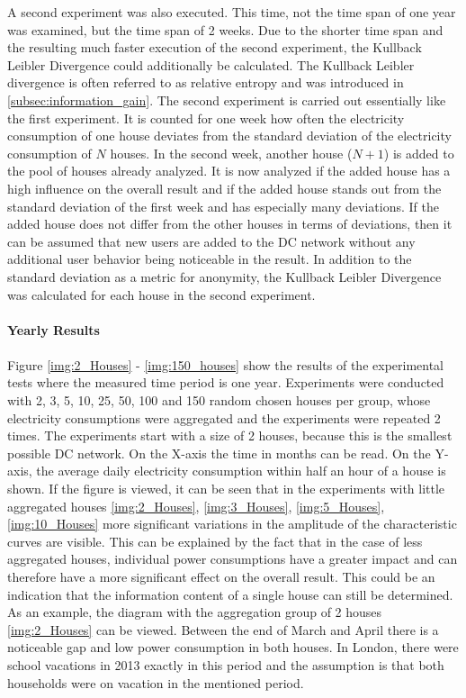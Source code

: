 A second experiment was also executed. This time, not the time span of one year was examined, but the time span of 2 weeks. Due to the shorter time span and the resulting much faster execution of the second experiment, the Kullback Leibler Divergence could additionally be calculated. 
The Kullback Leibler divergence is often referred to as relative entropy and was introduced in \ref{subsec:information_gain}.
The second experiment is carried out essentially like the first experiment. It is counted for one week how often the electricity consumption of one house deviates from the standard deviation of the electricity consumption of $N$ houses. In the second week, another house ($N+1$) is added to the pool of houses already analyzed. It is now analyzed if the added house has a high influence on the overall result and if the added house stands out from the standard deviation of the first week and has especially many deviations. If the added house does not differ from the other houses in terms of deviations, then it can be assumed that new users are added to the DC network without any additional user behavior being noticeable in the result. In addition to the standard deviation as a metric for anonymity, the Kullback Leibler Divergence was calculated for each house in the second experiment. 
\\
\\
\textbf{Yearly Results}
\\
\\
Figure \ref{img:2_Houses} - \ref{img:150_houses} show the results of the experimental tests where the measured time period is one year. Experiments were conducted with 2, 3, 5, 10, 25, 50, 100 and 150 random chosen houses per group, whose electricity consumptions were aggregated and the experiments were repeated 2 times. The experiments start with a size of 2 houses, because this is the smallest possible DC network. On the X-axis the time in months can be read. On the Y-axis, the average daily electricity consumption within half an hour of a house is shown. If the figure is viewed, it can be seen that in the experiments with little aggregated houses \ref{img:2_Houses}, \ref{img:3_Houses}, \ref{img:5_Houses}, \ref{img:10_Houses} more significant variations in the amplitude of the characteristic curves are visible. This can be explained by the fact that in the case of less aggregated houses, individual power consumptions have a greater impact and can therefore have a more significant effect on the overall result. This could be an indication that the information content of a single house can still be determined. As an example, the diagram  with the aggregation group of 2 houses \ref{img:2_Houses} can be viewed. Between the end of March and April there is a noticeable gap and low power consumption in both houses. In London, there were school vacations in 2013 exactly in this period and the assumption is that both households were on vacation in the mentioned period.\\
